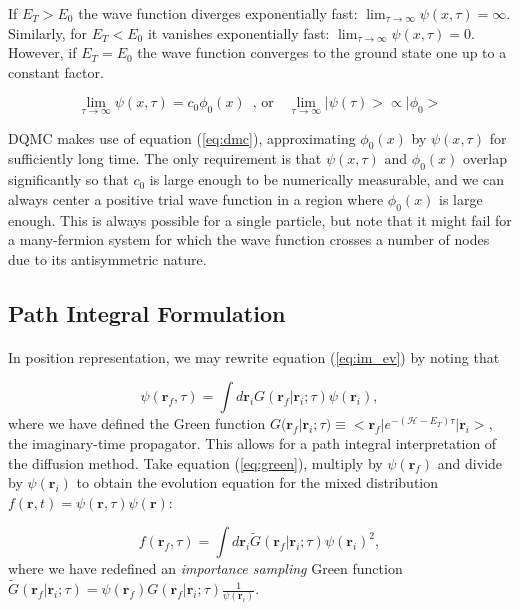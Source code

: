 If $E_T > E_0$ the wave function diverges exponentially fast: $\lim_{\tau \rightarrow \infty} \psi ( x, \tau) = \infty$. Similarly, for $E_T < E_0$ it vanishes exponentially fast: $
\lim_{\tau \rightarrow \infty} \psi ( x, \tau) = 0$. However, if $E_T = E_0$ the wave function converges to the ground state one up to a constant factor.

\begin{equation}\label{eq:dmc}
\lim_{\tau \rightarrow \infty} \psi ( x, \tau) = c_0 \phi_0 (x) \,\,\, \text{, or} \quad \lim_{\tau \rightarrow \infty} |\psi (\tau) > \propto | \phi_0 >
\end{equation}

DQMC makes use of equation (\ref{eq:dmc}), approximating $\phi_0(x)$ by $\psi (x, \tau)$ for sufficiently long time. The only requirement is that $\psi (x, \tau)$ and $\phi_0(x)$ overlap significantly so that $c_0$ is large enough to be numerically measurable, and we can always center a positive trial wave function in a region where $\phi_0(x)$ is large enough. This is always possible for a single particle,  but note that it might fail for a many-fermion system for which the wave function crosses a number of nodes due to its antisymmetric nature.\par

\subsection{Path Integral Formulation}\paragraph{}

In position representation, we may rewrite equation (\ref{eq:im_ev}) by noting that

\begin{equation}\label{eq:green}
\psi(\bm r_f, \tau) = \int d\bm r_i G( \bm r_f | \bm r_i ; \tau) \psi (\bm r_i) ,
\end{equation}
where we have defined the Green function $G( \bm r_f | \bm r_i ; \tau) \equiv < \bm r_f | e^{-(\mathcal{H} - E_T) \tau} | \bm r_i >$, the imaginary-time propagator. This allows for a path integral interpretation of the diffusion method. Take equation (\ref{eq:green}), multiply by $\psi (\bm r_f)$ and divide by $\psi (\bm r_i)$ to obtain the evolution equation for the mixed distribution $f(\bm r, t) = \psi (\bm r, \tau) \psi (\bm r)$:

\begin{equation}
f(\bm r_f, \tau) = \int d\bm r_i \tilde{G} ( \bm r_f | \bm r_i; \tau) \psi (\bm r_i)^2 ,
\end{equation}
where we have redefined an \emph{importance sampling} Green function $\tilde{G} (\bm r_f | \bm r_i; \tau) = \psi (\bm r_f) G(\bm r_f | \bm r_i ; \tau) \frac{1}{\psi(\bm r_i)}$. 

